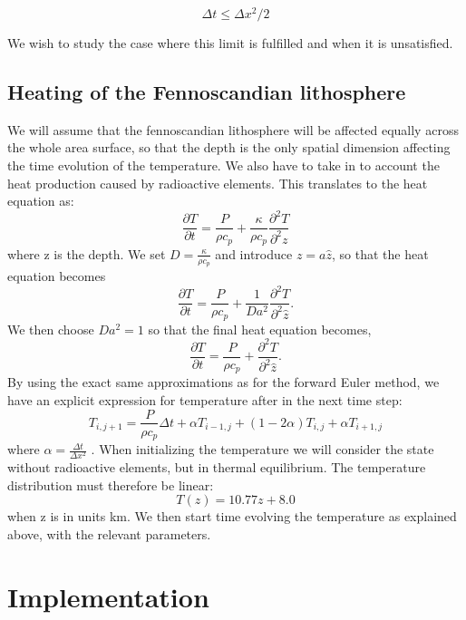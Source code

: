 \documentclass{article}
\begin{document}
\begin{multicols}{2}
\begin{equation}
\Delta t \leq \Delta x^2/2
\end{equation}

We wish to study the case where this limit is fulfilled and when it is unsatisfied. 

\subsection{Heating of the Fennoscandian lithosphere}

We will assume that the fennoscandian lithosphere will be affected equally across the whole area surface, so that the depth is the only spatial dimension affecting the time evolution of the temperature. We also have to take in to account the heat production caused by radioactive elements. This translates to the heat equation as:
\begin{equation}
	\frac{\partial T}{\partial t}= \frac{P}{\rho c_p} + \frac{\kappa}{\rho c_p}\frac{\partial^2 T}{\partial^2 z}
\end{equation}
where z is the depth. We set $D=\frac{\kappa}{\rho c_p}$ and introduce $z=a\hat{z}$, so that the heat equation becomes
\begin{equation}
	\frac{\partial T}{\partial t}=\frac{P}{\rho c_p}+\frac{1}{D a^2}\frac{\partial^2 T}{\partial^2 \hat{z}}.
\end{equation}
We then choose $Da^2=1$ so that the final heat equation becomes,
\begin{equation}
	\frac{\partial T}{\partial t}=\frac{P}{\rho c_p}+\frac{\partial^2 T}{\partial^2 \hat{z}}.
\end{equation}
By using the exact same approximations as for the forward Euler method, we have an explicit expression for temperature after in the next time step:
\begin{equation}
	T_{i,j+1}= \frac{P}{\rho c_p}\Delta t + \alpha T_{i-1,j}+(1-2\alpha )T_{i,j} + \alpha T_{i+1, j}
\end{equation}
where $\alpha=\frac{\Delta t}{\Delta x ^2}$ . 
When initializing the temperature we will consider the state without radioactive elements, but in thermal equilibrium. The temperature distribution must therefore be linear:
\begin{equation}
	T(z) = 10.77z + 8.0
\end{equation}
when z is in units km. We then start time evolving the temperature as explained above, with the relevant parameters. 


\section{Implementation}


\end{multicols}
\end{document}
